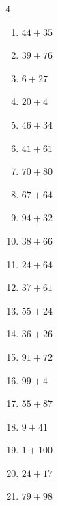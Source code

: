 \begin{multicols}{4}
\begin{enumerate}
  \item $44+35$
        \phantom{$=79$}

  \item $39+76$
        \phantom{$=115$}

  \item $6+27$
        \phantom{$=33$}

  \item $20+4$
        \phantom{$=24$}

  \item $46+34$
        \phantom{$=80$}

  \item $41+61$
        \phantom{$=102$}

  \item $70+80$
        \phantom{$=150$}

  \item $67+64$
        \phantom{$=131$}

  \item $94+32$
        \phantom{$=126$}

  \item $38+66$
        \phantom{$=104$}

\columnbreak %

\resetques

  \item $24+64$
        \phantom{$=88$}

  \item $37+61$
        \phantom{$=98$}

  \item $55+24$
        \phantom{$=79$}

  \item $36+26$
        \phantom{$=62$}

  \item $91+72$
        \phantom{$=163$}

  \item $99+4$
        \phantom{$=103$}

  \item $55+87$
        \phantom{$=142$}

  \item $9+41$
        \phantom{$=50$}

  \item $1+100$
        \phantom{$=101$}

  \item $24+17$
        \phantom{$=41$}

  \item $79+98$
        \phantom{$=177$}


\end{enumerate}
\end{multicols}
